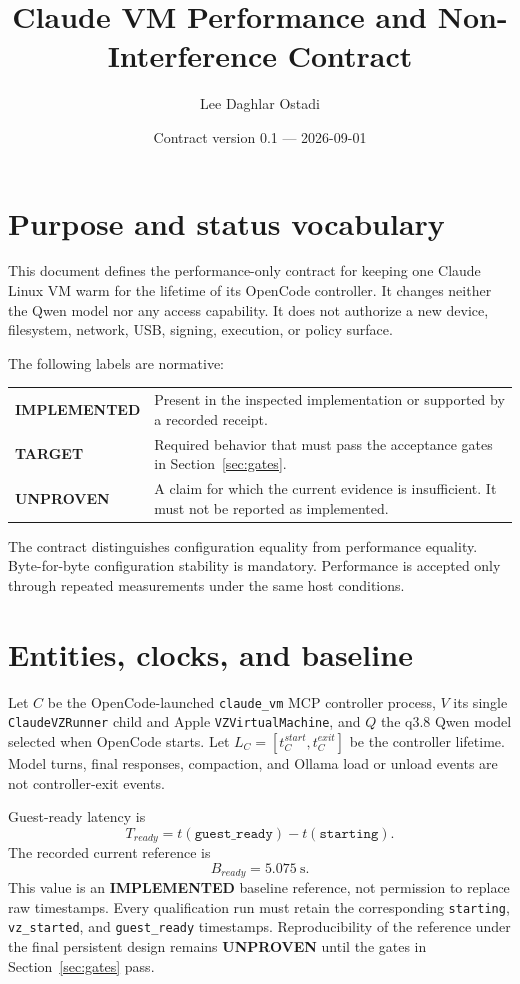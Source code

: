 \documentclass[10pt]{article}
\title{Claude VM Performance and Non-Interference Contract}
\author{Lee Daghlar Ostadi}
\date{Contract version 0.1 --- 2026-09-01}
\newcommand{\Implemented}{\textcolor{implemented}{\textbf{IMPLEMENTED}}}
\newcommand{\Target}{\textcolor{target}{\textbf{TARGET}}}
\newcommand{\Unproven}{\textcolor{unproven}{\textbf{UNPROVEN}}}
\newcommand{\code}[1]{\texttt{#1}}
\begin{document}
\maketitle
\vspace{-1.8em}

\section{Purpose and status vocabulary}

This document defines the performance-only contract for keeping one Claude Linux
VM warm for the lifetime of its OpenCode controller.  It changes neither the
Qwen model nor any access capability.  It does not authorize a new device,
filesystem, network, USB, signing, execution, or policy surface.

The following labels are normative:

\begin{center}
\begin{tabularx}{\linewidth}{@{}>{\bfseries}l X@{}}
\toprule
\Implemented & Present in the inspected implementation or supported by a recorded receipt. \\
\Target & Required behavior that must pass the acceptance gates in Section~\ref{sec:gates}. \\
\Unproven & A claim for which the current evidence is insufficient.  It must not be reported as implemented. \\
\bottomrule
\end{tabularx}
\end{center}

The contract distinguishes configuration equality from performance equality.
Byte-for-byte configuration stability is mandatory.  Performance is accepted
only through repeated measurements under the same host conditions.

\section{Entities, clocks, and baseline}

Let \(C\) be the OpenCode-launched \code{claude\_vm} MCP controller process,
\(V\) its single \code{ClaudeVZRunner} child and Apple
\code{VZVirtualMachine}, and \(Q\) the q3.8 Qwen model selected when OpenCode
starts.  Let \(L_C=[t_C^{start},t_C^{exit}]\) be the controller lifetime.
Model turns, final responses, compaction, and Ollama load or unload events are
not controller-exit events.

Guest-ready latency is
\[
  T_{ready}=t(\code{guest\_ready})-t(\code{starting}).
\]
The recorded current reference is
\[
  B_{ready}=5.075\ \mathrm{s}.
\]
This value is an \Implemented{} baseline reference, not permission to replace
raw timestamps.  Every qualification run must retain the corresponding
\code{starting}, \code{vz\_started}, and \code{guest\_ready} timestamps.
Reproducibility of the reference under the final persistent design remains
\Unproven{} until the gates in Section~\ref{sec:gates} pass.
\end{document}
